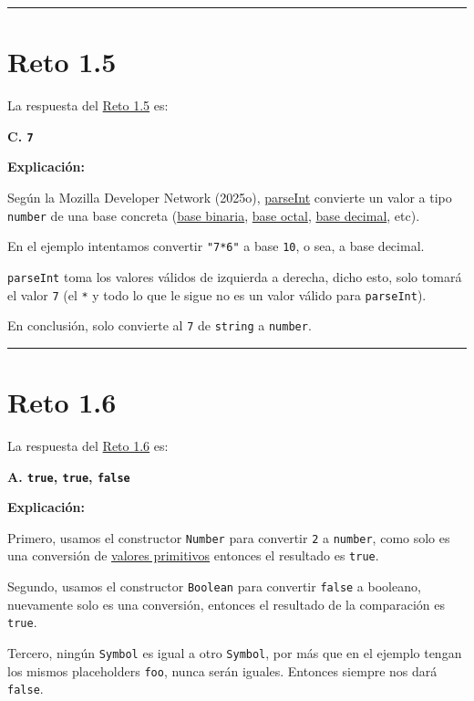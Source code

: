 \documentclass[
  letterpaper,
  DIV=11,
  numbers=noendperiod]{scrreprt}
\begin{document}
\begin{center}\rule{0.5\linewidth}{0.5pt}\end{center}

\section{Reto 1.5}\label{sec-sol-cap1-reto5}

La respuesta del \hyperref[sec-cap1-reto5]{Reto 1.5} es:

\textbf{C. \texttt{7}}

\textbf{Explicación:}

Según la Mozilla Developer Network (2025o),
\hyperref[glos-parseint]{parseInt} convierte un valor a tipo
\texttt{number} de una base concreta (\hyperref[glos-binaria]{base
binaria}, \hyperref[glos-octal]{base octal},
\hyperref[glos-decimal]{base decimal}, etc).

En el ejemplo intentamos convertir \texttt{"7*6"} a base \texttt{10}, o
sea, a base decimal.

\texttt{parseInt} toma los valores válidos de izquierda a derecha, dicho
esto, solo tomará el valor \texttt{7} (el \texttt{*} y todo lo que le
sigue no es un valor válido para \texttt{parseInt}).

En conclusión, solo convierte al \texttt{7} de \texttt{string} a
\texttt{number}.

\begin{center}\rule{0.5\linewidth}{0.5pt}\end{center}

\section{Reto 1.6}\label{sec-sol-cap1-reto6}

La respuesta del \hyperref[sec-cap1-reto6]{Reto 1.6} es:

\textbf{A. \texttt{true}, \texttt{true}, \texttt{false}}

\textbf{Explicación:}

Primero, usamos el constructor \texttt{Number} para convertir \texttt{2}
a \texttt{number}, como solo es una conversión de
\hyperref[glos-primitivo]{valores primitivos} entonces el resultado es
\texttt{true}.

Segundo, usamos el constructor \texttt{Boolean} para convertir
\texttt{false} a booleano, nuevamente solo es una conversión, entonces
el resultado de la comparación es \texttt{true}.

Tercero, ningún \texttt{Symbol} es igual a otro \texttt{Symbol}, por más
que en el ejemplo tengan los mismos placeholders \texttt{foo}, nunca
serán iguales. Entonces siempre nos dará \texttt{false}.
\end{document}
